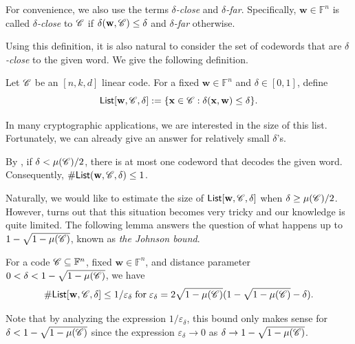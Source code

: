 \documentclass[../../book]{subfiles}
\begin{document}
For convenience, we also use the terms \emph{$\delta$-close} and \emph{$\delta$-far}.
Specifically, $\mathbf{w} \in \mathbb{F}^n$ is called \emph{$\delta$-close} to $\mathscr{C}$ if $\delta(\mathbf{w}, \mathscr{C}) \leq \delta$ and \emph{$\delta$-far} otherwise.

Using this definition, it is also natural to consider the set of codewords that are \emph{$\delta$-close} to the given word.
We give the following definition.
\begin{definition}
  Let $\mathscr{C}$ be an $[n,k,d]$ linear code. For a fixed $\mathbf{w} \in \mathbb{F}^n$ and $\delta \in [0,1]$, define
  \begin{equation*}
      \mathsf{List}[\mathbf{w},\mathscr{C},\delta] := \{\mathbf{x} \in \mathscr{C}: \delta(\mathbf{x}, \mathbf{w}) \leq \delta\}.
  \end{equation*}
\end{definition}

In many cryptographic applications, we are interested in the size of this list. 
Fortunately, we can already give an answer for relatively small $\delta$'s.

\begin{example}
    By , if $\delta < \mu(\mathscr{C})/2$, there is at most one codeword that decodes the given word. Consequently, $\#\mathsf{List}(\mathbf{w},\mathscr{C},\delta) \leq 1$.
\end{example}

Naturally, we would like to estimate the size of $\mathsf{List}[\mathbf{w},\mathscr{C},\delta]$ when $\delta \geq \mu(\mathscr{C})/2$.
However, turns out that this situation becomes very tricky and our knowledge is quite limited.
The following lemma answers the question of what happens up to $1-\sqrt{1-\mu(\mathscr{C})}$, known as \emph{the Johnson bound}.

\begin{theorem}\label{th:johnson-bound}
  For a code $\mathscr{C} \subseteq \mathbb{F}^n$, fixed $\mathbf{w} \in \mathbb{F}^n$, and distance parameter $0 < \delta < 1-\sqrt{1-\mu(\mathscr{C})}$, we have
  \begin{equation*}
    \#\mathsf{List}[\mathbf{w},\mathscr{C},\delta] \leq 1/\varepsilon_{\delta} \; \text{for} \; \varepsilon_{\delta} = 2\sqrt{1-\mu(\mathscr{C})}(1-\sqrt{1-\mu(\mathscr{C})}-\delta).
  \end{equation*}
\end{theorem}

Note that by analyzing the expression $1/\varepsilon_{\delta}$, this bound only makes sense for $\delta < 1-\sqrt{1-\mu(\mathscr{C})}$ since the expression $\varepsilon_{\delta} \to 0$ as $\delta \to 1-\sqrt{1-\mu(\mathscr{C})}$.
\end{document}
